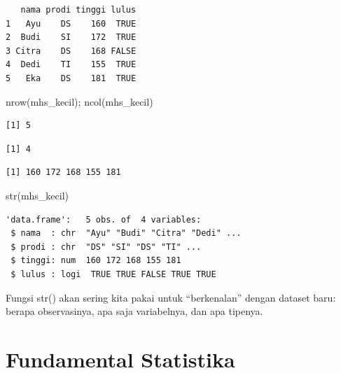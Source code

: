 \documentclass[
  indonesian,
  letterpaper,
]{book}
\newenvironment{Shaded}{\begin{snugshade}}{\end{snugshade}}
\newcommand{\FunctionTok}[1]{\textcolor[rgb]{0.28,0.35,0.67}{#1}}
\newcommand{\NormalTok}[1]{\textcolor[rgb]{0.00,0.23,0.31}{#1}}
\newcommand{\SpecialCharTok}[1]{\textcolor[rgb]{0.37,0.37,0.37}{#1}}
\begin{document}
\begin{verbatim}
   nama prodi tinggi lulus
1   Ayu    DS    160  TRUE
2  Budi    SI    172  TRUE
3 Citra    DS    168 FALSE
4  Dedi    TI    155  TRUE
5   Eka    DS    181  TRUE
\end{verbatim}

\begin{Shaded}
\begin{Highlighting}[]
\FunctionTok{nrow}\NormalTok{(mhs\_kecil); }\FunctionTok{ncol}\NormalTok{(mhs\_kecil)}
\end{Highlighting}
\end{Shaded}

\begin{verbatim}
[1] 5
\end{verbatim}

\begin{verbatim}
[1] 4
\end{verbatim}

\begin{Shaded}
\end{Shaded}

\begin{verbatim}
[1] 160 172 168 155 181
\end{verbatim}

\begin{Shaded}
\begin{Highlighting}[]
\FunctionTok{str}\NormalTok{(mhs\_kecil)}
\end{Highlighting}
\end{Shaded}

\begin{verbatim}
'data.frame':   5 obs. of  4 variables:
 $ nama  : chr  "Ayu" "Budi" "Citra" "Dedi" ...
 $ prodi : chr  "DS" "SI" "DS" "TI" ...
 $ tinggi: num  160 172 168 155 181
 $ lulus : logi  TRUE TRUE FALSE TRUE TRUE
\end{verbatim}

Fungsi str() akan sering kita pakai untuk ``berkenalan'' dengan dataset
baru: berapa observasinya, apa saja variabelnya, dan apa tipenya.

\section{Fundamental Statistika}\label{fundamental-statistika}
\end{document}

